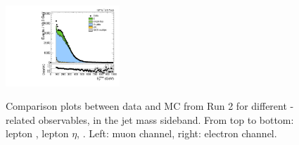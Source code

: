 \begin{figure}[htbp]
  \includegraphics[width=0.3825\textwidth]{fig/controlPlots/SB_b1_e_allP_allC_allD_Run2_met_pt.pdf}\\
  \caption{
    Comparison plots between data and MC from Run 2 for different \Wlep-related observables, in the jet mass sideband.
    From top to bottom: lepton \pt, lepton $\eta$, \Etmiss.
    Left: muon channel, right: electron channel.
  }
  \label{fig:SB_controlPlotsRun2_1}
\end{figure}

